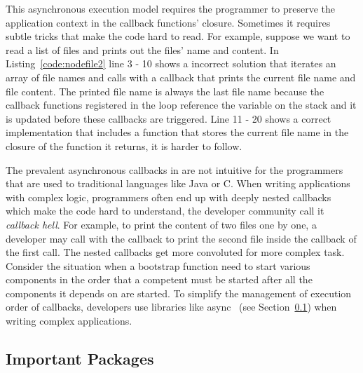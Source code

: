 This asynchronous execution model requires the programmer to preserve the
application context in the callback functions' closure.  Sometimes it requires
subtle tricks that make the code hard to read. For example, suppose we want to
read a list of files and prints out the files' name and content. In
Listing~\ref{code:nodefile2}  line 3 - 10 shows a incorrect solution that
iterates an array of file names  and calls  with a callback
that prints the current file name and file content. The printed file name is
always the last file name because the callback functions registered in the
loop reference the  variable on the stack and it is updated
before these callbacks are triggered. Line 11 - 20 shows a correct
implementation  that includes a function that  stores the current file name in
the closure of the function it returns, it is harder to follow.



The prevalent asynchronous callbacks in \js are not intuitive for the
programmers that are used to traditional languages like Java or C. When
writing applications with complex logic, programmers often end up with deeply
nested callbacks which make the code hard to understand, the developer
community call it \emph{callback hell}. For example, to print the content of
two files one by one, a developer may call  with the callback
to print the second file  inside the callback of the first 
call. The nested callbacks get more convoluted for more complex task. Consider
the situation when a bootstrap function need to start various components in
the order that a competent must be started after all the components it depends
on are started.  To simplify the management of execution order of callbacks,
developers use libraries like async~\cite{async} (see
Section~\ref{sec:nodepackage}) when writing complex applications.




\subsection{Important \nodejs Packages}
\label{sec:nodepackage}

